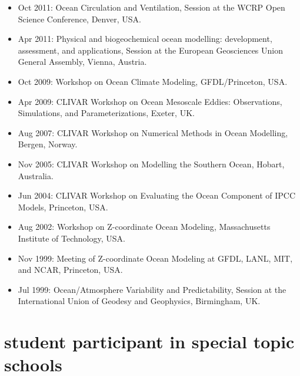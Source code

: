 \documentclass{article}
\begin{document}
\begin{itemize}[leftmargin=*]
\item Oct 2011: {\sc Ocean Circulation and Ventilation}, Session at the WCRP Open Science Conference, Denver, USA. 

\item Apr 2011: {\sc Physical and biogeochemical ocean modelling: development, assessment, and applications}, Session at the European Geosciences Union General Assembly, Vienna, Austria.

\item Oct 2009: {\sc Workshop on Ocean Climate Modeling},
  GFDL/Princeton, USA.

 \item Apr 2009: {\sc CLIVAR Workshop on Ocean Mesoscale Eddies: Observations, Simulations, and Parameterizations}, Exeter, UK.

\item Aug 2007: {\sc CLIVAR Workshop on Numerical Methods in Ocean Modelling}, Bergen, Norway.

\item Nov 2005: {\sc CLIVAR Workshop on Modelling the Southern Ocean}, Hobart, Australia.

\item Jun 2004: {\sc CLIVAR Workshop on Evaluating the Ocean
  Component of IPCC Models}, Princeton, USA.

\item Aug 2002: {\sc Workshop on Z-coordinate Ocean Modeling}, Massachusetts Institute of Technology, USA.

\item Nov 1999: {\sc Meeting of Z-coordinate Ocean Modeling at GFDL, LANL, MIT, and NCAR}, Princeton, USA.

\item Jul 1999: {\sc Ocean/Atmosphere Variability and
  Predictability}, Session at the International Union of Geodesy and Geophysics, Birmingham, UK.

\end{itemize}


\section*{\sc \color{Maroon}  student participant in special topic schools}
\vspace{-.3cm}
\end{document}
